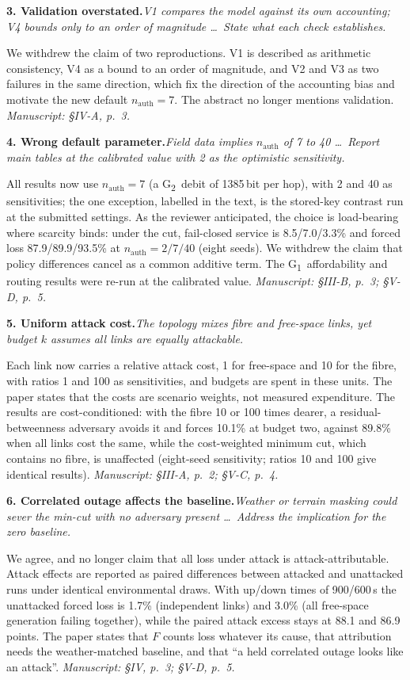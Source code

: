 \documentclass[10pt,a4paper]{article}
\newcommand{\loc}[1]{\textit{Manuscript: #1.}}
\newcommand{\GI}{G\textsubscript{1}}
\newcommand{\GII}{G\textsubscript{2}}
\newcommand{\comment}[2]{\par\medskip\noindent\textbf{#1}\hspace{0.4em}\textit{#2}\par}
\begin{document}
\comment{3. Validation overstated.}{V1 compares the model against its own accounting; V4 bounds only to an order of magnitude \ldots\ State what each check establishes.}
We withdrew the claim of two reproductions. V1 is described as arithmetic
consistency, V4 as a bound to an order of magnitude, and V2 and V3 as two failures in
the same direction, which fix the direction of the accounting bias and motivate the
new default $n_{\mathrm{auth}}=7$. The abstract no longer mentions validation.
\loc{\S IV-A, p.~3}

\comment{4. Wrong default parameter.}{Field data implies $n_{\mathrm{auth}}$ of 7 to 40 \ldots\ Report main tables at the calibrated value with 2 as the optimistic sensitivity.}
All results now use $n_{\mathrm{auth}}=7$ (a \GII\ debit of 1385\,bit per hop), with 2
and 40 as sensitivities; the one exception, labelled in the text, is the stored-key
contrast run at the submitted settings. As the reviewer anticipated, the choice is
load-bearing where scarcity binds: under the cut, fail-closed service is
8.5/7.0/3.3\% and forced loss 87.9/89.9/93.5\% at $n_{\mathrm{auth}}=2/7/40$ (eight
seeds). We withdrew the claim that policy differences cancel as a common additive
term. The \GI\ affordability and routing results were re-run at the calibrated value.
\loc{\S III-B, p.~3; \S V-D, p.~5}

\comment{5. Uniform attack cost.}{The topology mixes fibre and free-space links, yet budget $k$ assumes all links are equally attackable.}
Each link now carries a relative attack cost, 1 for free-space and 10 for the fibre,
with ratios 1 and 100 as sensitivities, and budgets are spent in these units. The
paper states that the costs are scenario weights, not measured expenditure. The
results are cost-conditioned: with the fibre 10 or 100 times dearer, a
residual-betweenness adversary avoids it and forces 10.1\% at budget two, against
89.8\% when all links cost the same, while the cost-weighted minimum cut, which
contains no fibre, is unaffected (eight-seed sensitivity; ratios 10 and 100 give
identical results).
\loc{\S III-A, p.~2; \S V-C, p.~4}

\comment{6. Correlated outage affects the baseline.}{Weather or terrain masking could sever the min-cut with no adversary present \ldots\ Address the implication for the zero baseline.}
We agree, and no longer claim that all loss under attack is attack-attributable.
Attack effects are reported as paired differences between attacked and unattacked runs under
identical environmental draws. With up/down times of 900/600\,s the unattacked forced
loss is 1.7\% (independent links) and 3.0\% (all free-space generation failing
together), while the paired attack excess stays at 88.1 and 86.9 points. The paper
states that $F$ counts loss whatever its cause, that attribution needs the
weather-matched baseline, and that ``a held correlated outage looks like an attack''.
\loc{\S IV, p.~3; \S V-D, p.~5}
\end{document}
